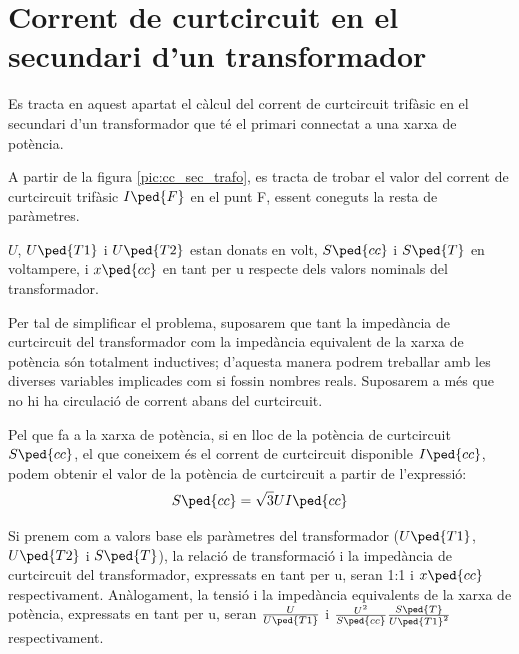 \section{Corrent de curtcircuit en el  secundari d'un transformador}
\label{sec:cc-sec-trafo}

 Es tracta en aquest apartat el càlcul del corrent de curtcircuit trifàsic en el secundari d'un transformador que té el
primari connectat  a una xarxa de potència.

A partir de la figura \vref{pic:cc_sec_trafo}, es tracta de trobar
el valor del corrent de curtcircuit trifàsic $I\ped{F}$ en el punt
F, essent coneguts la resta de paràmetres.

\begin{center}
    
     \label{pic:cc_sec_trafo}
\end{center}

$U$, $U\ped{T1}$ i $U\ped{T2}$ estan donats en volt,
$S\ped{cc}$ i $S\ped{T}$ en voltampere, i $x\ped{cc}$ en tant per u
respecte dels valors nominals del transformador.


Per tal de simplificar el problema, suposarem que tant la impedància
de curtcircuit del transformador com la impedància equivalent de
la xarxa de potència són totalment inductives; d'aquesta manera
podrem treballar amb les diverses variables implicades com si
fossin nombres reals. Suposarem a més que no hi ha circulació de
corrent abans del curtcircuit.

Pel que fa a la xarxa de potència, si en lloc de la potència de curtcircuit $S\ped{cc}$, el que coneixem és el corrent de curtcircuit
disponible $I\ped{cc}$, podem obtenir el valor de la potència de
curtcircuit a partir de l'expressió:
\begin{equation}
    S\ped{cc} = \sqrt{3} U I\ped{cc}
\end{equation}

 Si prenem com a valors base els
paràmetres del transformador ($U\ped{T1}$, $U\ped{T2}$ i
$S\ped{T}$), la relació de transformació i la impedància de curtcircuit del transformador, expressats en tant per u, seran 1:1 i
$x\ped{cc}$ respectivament. Anàlogament, la tensió i la impedància
equivalents de la xarxa de potència, expressats en tant per u, seran
$\frac{U}{U\ped{T1}}$ i $\frac{U^2}{S\ped{cc}}
\frac{S\ped{T}}{U\ped{T1}^2}$ respectivament.

